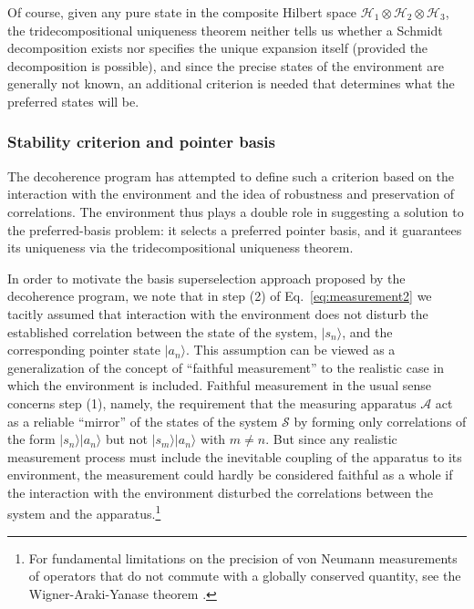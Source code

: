 \documentclass[rmp,aps,amsmath,amsfonts,noshowkeys,noshowpacs,12pt]{revtex4}
\newcommand{\ket}[1]{\ensuremath{|{#1\rangle}}}
\begin{document}
Of course, given any pure state in the composite Hilbert space
$\mathcal{H}_1 \otimes \mathcal{H}_2 \otimes \mathcal{H}_3$, the
tridecompositional uniqueness theorem neither tells us whether a
Schmidt decomposition exists nor specifies the unique expansion itself
(provided the decomposition is possible), and since the precise states
of the environment are generally not known, an additional criterion is
needed that determines what the preferred states will be.


\subsubsection{Stability criterion and pointer basis}

The decoherence program has attempted to define such a criterion based
on the interaction with the environment and the idea of robustness and
preservation of correlations. The environment thus plays a double role
in suggesting a solution to the preferred-basis problem: it selects a
preferred pointer basis, and it guarantees its uniqueness via the
tridecompositional uniqueness theorem.

In order to motivate the basis superselection approach proposed by the
decoherence program, we note that in step (2) of
Eq.~\eqref{eq:measurement2} we tacitly assumed that interaction with
the environment does not disturb the established correlation between
the state of the system, $\ket{s_n}$, and the corresponding pointer
state $\ket{a_n}$. This assumption can be viewed as a generalization
of the concept of ``faithful measurement'' to the realistic case in which
the environment is included.  Faithful measurement in the usual sense
concerns step (1), namely, the requirement that the measuring
apparatus $\mathcal{A}$ act as a reliable ``mirror'' of the states of
the system $\mathcal{S}$ by forming only correlations of the form
$\ket{s_n}\ket{a_n}$ but not $\ket{s_m} \ket{a_n}$ with $m \not= n$.
But since any realistic measurement process must include the
inevitable coupling of the apparatus to its environment, the
measurement could hardly be considered faithful as a whole if the
interaction with the environment disturbed the correlations between
the system and the apparatus.\footnote{For fundamental limitations on
  the precision of von Neumann measurements of operators that do not
  commute with a globally conserved quantity, see the
  Wigner-Araki-Yanase theorem \citep{Wigner:1952:gb,Araki:1960:ff}.}
\end{document}
